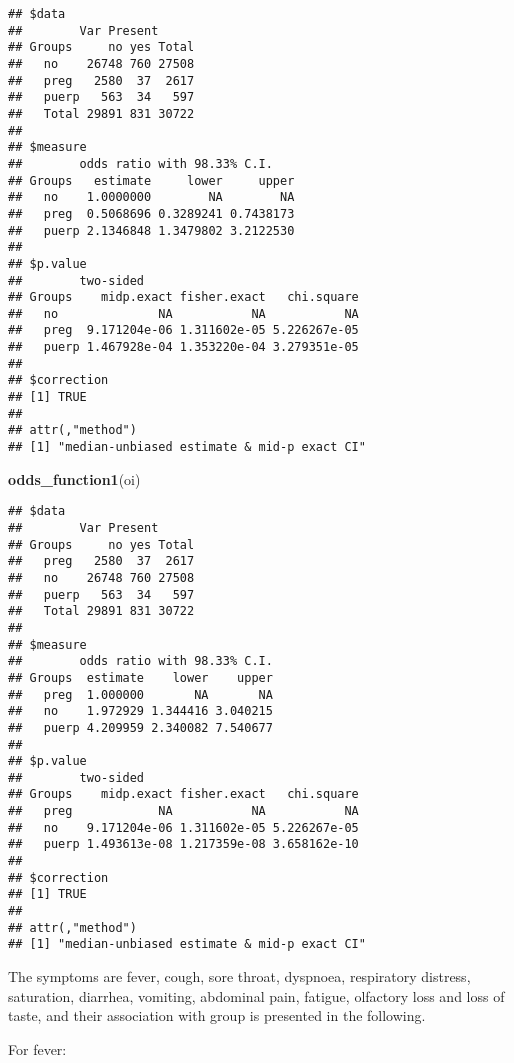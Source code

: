 \documentclass[
]{article}
\newenvironment{Shaded}{\begin{snugshade}}{\end{snugshade}}
\newcommand{\DataTypeTok}[1]{\textcolor[rgb]{0.13,0.29,0.53}{#1}}
\newcommand{\KeywordTok}[1]{\textcolor[rgb]{0.13,0.29,0.53}{\textbf{#1}}}
\newcommand{\NormalTok}[1]{#1}
\newcommand{\OperatorTok}[1]{\textcolor[rgb]{0.81,0.36,0.00}{\textbf{#1}}}
\newcommand{\OtherTok}[1]{\textcolor[rgb]{0.56,0.35,0.01}{#1}}
\newcommand{\StringTok}[1]{\textcolor[rgb]{0.31,0.60,0.02}{#1}}
\begin{document}
\begin{verbatim}
## $data
##        Var Present
## Groups     no yes Total
##   no    26748 760 27508
##   preg   2580  37  2617
##   puerp   563  34   597
##   Total 29891 831 30722
## 
## $measure
##        odds ratio with 98.33% C.I.
## Groups   estimate     lower     upper
##   no    1.0000000        NA        NA
##   preg  0.5068696 0.3289241 0.7438173
##   puerp 2.1346848 1.3479802 3.2122530
## 
## $p.value
##        two-sided
## Groups    midp.exact fisher.exact   chi.square
##   no              NA           NA           NA
##   preg  9.171204e-06 1.311602e-05 5.226267e-05
##   puerp 1.467928e-04 1.353220e-04 3.279351e-05
## 
## $correction
## [1] TRUE
## 
## attr(,"method")
## [1] "median-unbiased estimate & mid-p exact CI"
\end{verbatim}

\begin{Shaded}
\begin{Highlighting}[]
\KeywordTok{odds_function1}\NormalTok{(oi)}
\end{Highlighting}
\end{Shaded}

\begin{verbatim}
## $data
##        Var Present
## Groups     no yes Total
##   preg   2580  37  2617
##   no    26748 760 27508
##   puerp   563  34   597
##   Total 29891 831 30722
## 
## $measure
##        odds ratio with 98.33% C.I.
## Groups  estimate    lower    upper
##   preg  1.000000       NA       NA
##   no    1.972929 1.344416 3.040215
##   puerp 4.209959 2.340082 7.540677
## 
## $p.value
##        two-sided
## Groups    midp.exact fisher.exact   chi.square
##   preg            NA           NA           NA
##   no    9.171204e-06 1.311602e-05 5.226267e-05
##   puerp 1.493613e-08 1.217359e-08 3.658162e-10
## 
## $correction
## [1] TRUE
## 
## attr(,"method")
## [1] "median-unbiased estimate & mid-p exact CI"
\end{verbatim}

The symptoms are fever, cough, sore throat, dyspnoea, respiratory
distress, saturation, diarrhea, vomiting, abdominal pain, fatigue,
olfactory loss and loss of taste, and their association with group is
presented in the following.

For fever:

\begin{Shaded}
\end{Shaded}
\end{document}
